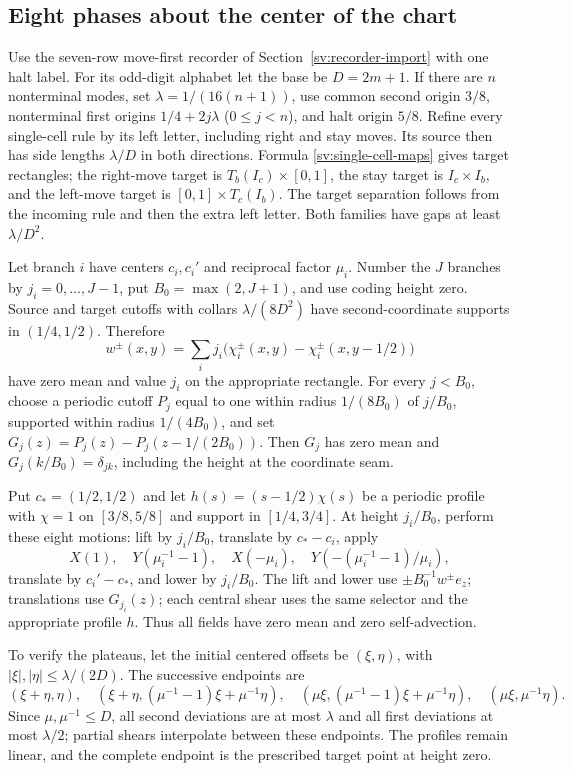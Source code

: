 \subsection{Eight phases about the center of the chart}
\label{sv:centered}
Use the seven-row move-first recorder of Section~\ref{sv:recorder-import} with one halt label.  For its
odd-digit alphabet let the base be $D=2m+1$.  If there are $n$
nonterminal modes, set $\lambda=1/(16(n+1))$, use common second
origin $3/8$, nonterminal first origins $1/4+2j\lambda$
($0\le j<n$), and halt origin $5/8$.  Refine every single-cell
rule by its left letter, including right and stay moves.  Its source
then has side lengths $\lambda/D$ in both directions.  Formula
\eqref{sv:single-cell-maps} gives target rectangles; the right-move
target is $T_b(I_c)\times[0,1]$, the stay target is
$I_c\times I_b$, and the left-move target is
$[0,1]\times T_c(I_b)$.  The target separation follows from the
incoming rule and then the extra left letter.  Both families have gaps
at least $\lambda/D^2$.

Let branch $i$ have centers $c_i,c_i'$ and reciprocal factor $\mu_i$.
Number the $J$ branches by $j_i=0,\ldots,J-1$, put
$B_0=\max(2,J+1)$, and use coding height zero.  Source and target
cutoffs with collars $\lambda/(8D^2)$ have second-coordinate
supports in $(1/4,1/2)$.  Therefore
\[
 w^\pm(x,y)=\sum_i j_i\bigl(\chi_i^\pm(x,y)
                  -\chi_i^\pm(x,y-1/2)\bigr)
\]
have zero mean and value $j_i$ on the appropriate rectangle.
For every $j<B_0$, choose a periodic cutoff $P_j$ equal to one
within radius $1/(8B_0)$ of $j/B_0$, supported within radius
$1/(4B_0)$, and set
$G_j(z)=P_j(z)-P_j(z-1/(2B_0))$.
Then $G_j$ has zero mean and $G_j(k/B_0)=\delta_{jk}$,
including the height at the coordinate seam.

Put $c_*=(1/2,1/2)$ and let $h(s)=(s-1/2)\chi(s)$ be a
periodic profile with $\chi=1$ on $[3/8,5/8]$ and support in
$[1/4,3/4]$.  At height $j_i/B_0$, perform these eight motions:
lift by $j_i/B_0$, translate by $c_*-c_i$, apply
\[
 X(1),\quad Y(\mu_i^{-1}-1),\quad X(-\mu_i),\quad
 Y(-(\mu_i^{-1}-1)/\mu_i),
\]
translate by $c_i'-c_*$, and lower by $j_i/B_0$.
The lift and lower use $\pm B_0^{-1}w^\pm e_z$; translations
use $G_{j_i}(z)$; each central shear uses the same selector and the
appropriate profile $h$.  Thus all fields have zero mean and zero
self-advection.

To verify the plateaus, let the initial centered offsets be $(\xi,\eta)$,
with $|\xi|,|\eta|\le\lambda/(2D)$.  The successive endpoints
are
\[
 (\xi+\eta,\eta),\quad
 (\xi+\eta,(\mu^{-1}-1)\xi+\mu^{-1}\eta),\quad
 (\mu\xi,(\mu^{-1}-1)\xi+\mu^{-1}\eta),\quad
 (\mu\xi,\mu^{-1}\eta).
\]
Since $\mu,\mu^{-1}\le D$, all second deviations are at most
$\lambda$ and all first deviations at most $\lambda/2$;
partial shears interpolate between these endpoints.  The profiles
remain linear, and the complete endpoint is the prescribed target
point at height zero.

